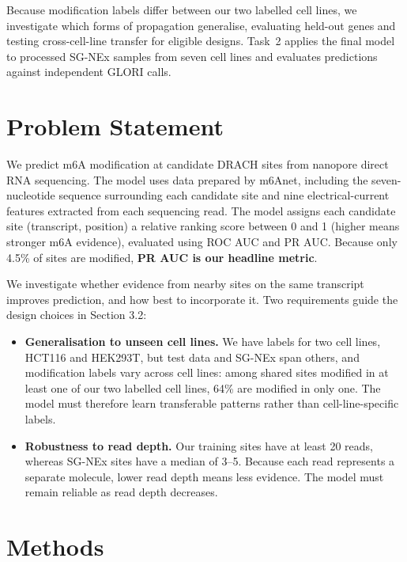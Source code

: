 \documentclass[11pt,a4paper]{article}
\begin{document}
Because modification labels differ between our two labelled cell lines, we
investigate which forms of propagation generalise, evaluating held-out genes and testing cross-cell-line
transfer for eligible designs. Task~2 applies the final model to processed SG-NEx samples from seven
cell lines and evaluates predictions against independent GLORI calls.

\section{Problem Statement}

We predict m6A modification at candidate DRACH sites from nanopore direct
RNA sequencing. The model uses data prepared by m6Anet, including the seven-nucleotide sequence surrounding each candidate site and nine electrical-current features extracted from each sequencing read. The model assigns each candidate site
(transcript, position) a relative ranking score between 0 and 1 (higher
means stronger m6A evidence), evaluated using ROC AUC and PR AUC. Because only 4.5\% of sites are modified, \textbf{PR AUC is our headline
metric}.

We investigate whether evidence from nearby sites on the same transcript
improves prediction, and how best to incorporate it. Two requirements guide
the design choices in Section 3.2:
\begin{itemize}
    \item \textbf{Generalisation to unseen cell lines.} We have labels for two
    cell lines, HCT116 and HEK293T, but test data and SG-NEx span others, and
    modification labels vary across cell lines: among shared sites modified in
    at least one of our two labelled cell lines, 64\% are modified in only one. 
    The model must therefore learn transferable patterns rather than 
    cell-line-specific labels.
    \item \textbf{Robustness to read depth.} Our training sites have at least 20 
    reads, whereas SG-NEx sites have a median of 3--5. Because each read 
    represents a separate molecule, lower read depth means less evidence. The 
    model must remain reliable as read depth decreases.
\end{itemize}

\section{Methods}
\end{document}
